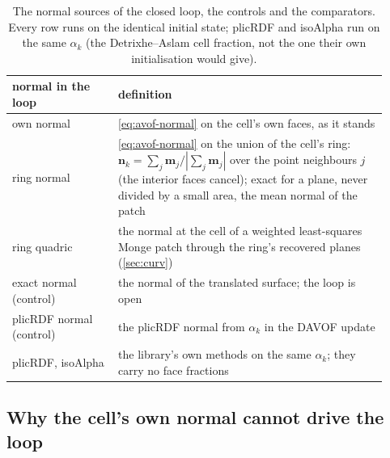 \begin{table}[htbp]
\centering
\caption{The normal sources of the closed loop, the controls and the comparators. Every row runs on the identical initial state; plicRDF and isoAlpha run on the same $\alpha_k$ (the Detrixhe--Aslam cell fraction, not the one their own initialisation would give).}
\label{tab:tpf-sources}
\footnotesize
\begin{tabular}{p{0.26\linewidth}p{0.66\linewidth}}
\toprule
normal in the loop & definition \\
\midrule
own normal & \cref{eq:avof-normal} on the cell's own faces, as it stands \\
ring normal & \cref{eq:avof-normal} on the union of the cell's ring: $\mathbf{n}_k = \sum_j \mathbf{m}_j / |\sum_j \mathbf{m}_j|$ over the point neighbours $j$ (the interior faces cancel); exact for a plane, never divided by a small area, the mean normal of the patch \\
ring quadric & the normal at the cell of a weighted least-squares Monge patch through the ring's recovered planes (\cref{sec:curv}) \\
exact normal (control) & the normal of the translated surface; the loop is open \\
plicRDF normal (control) & the plicRDF normal from $\alpha_k$ in the DAVOF update \\
\midrule
plicRDF, isoAlpha & the library's own methods on the same $\alpha_k$; they carry no face fractions \\
\bottomrule
\end{tabular}
\end{table}

\subsection{Why the cell's own normal cannot drive the loop}
\label{sec:tpf-sliver}

